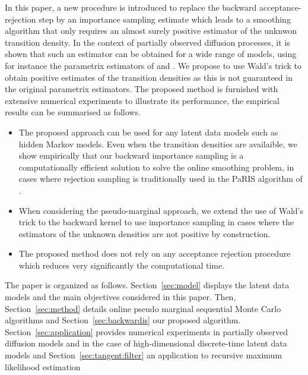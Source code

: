 \documentclass{article}
\begin{document}
In this paper, a new procedure is introduced to  replace the backward acceptance-rejection step by an importance sampling estimate which leads to a smoothing algorithm that only requires an almost surely positive estimator of the unknwon transition density. In the context of partially observed diffusion processes, it is shown that such an estimator can be obtained for a wide range of models, using for instance the parametrix estimators of \cite{andersson2017unbiased} and \cite{fearnhead2017continuous}.  We propose to use Wald's trick to obtain positive estimates of the transition densities as this is not guaranteed in the original parametrix estimators.
The proposed method is furnished with extensive numerical experiments to illustrate its performance, the empirical results can be summarised as follows.
\begin{itemize}
\item The proposed approach can be used for any latent data models such as hidden Markov models. Even when the transition densities are availaible, we show empirically that our backward importance sampling is a computationally efficient solution to solve the online smoothing problem, in cases where rejection sampling is  traditionally used in the PaRIS algorithm of \cite{olsson2017efficient}.
\item When considering the pseudo-marginal approach, we extend the use of Wald's trick to the backward kernel to use importance sampling in cases where the estimators of the unknown densities  are not positive by construction.
\item The proposed method does not rely on any acceptance rejection procedure which reduces very significantly the computational time. 
\end{itemize}
The paper is organized as follows. Section~\ref{sec:model} displays the latent data models and the main objectives considered in this paper. Then, Section~\ref{sec:method} details online pseudo marginal sequential Monte Carlo algorithms and Section~\ref{sec:backwardis} our proposed algorithm. Section~\ref{sec:application}  provides numerical experiments in  partially observed diffusion  models and in the case of high-dimensional discrete-time latent data models and Section~\ref{sec:tangent:filter} an application to recursive maximum likelihood estimation
\end{document}
